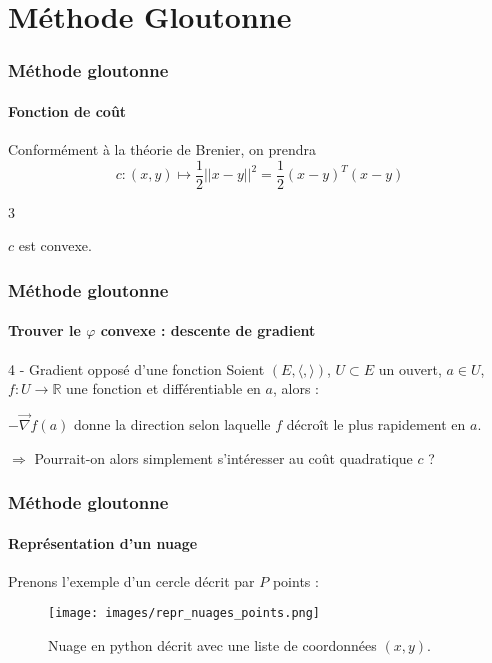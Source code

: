 \documentclass{beamer}
\newcommand{\prop}[2]{\begin{PROP}{#1}{}#2\end{PROP}}
\begin{document}
\section{Méthode Gloutonne}









\begin{frame}
	\frametitle{Méthode gloutonne}
	\framesubtitle{Fonction de coût}
	Conformément à la théorie de Brenier, on prendra \[c : (x,y) \mapsto \frac{1}{2} || x-y ||^2 = \frac{1}{2} (x-y)^T (x-y)\]

	\prop{3}{
		\begin{center}
			$c$ est convexe.
		\end{center}
	}
\end{frame}


\begin{comment}
\begin{frame}
	\frametitle{Méthode gloutonne}
	\framesubtitle{Trouver le $\varphi$ convexe}
	Dans la théorie de Brenier, on utilise un potentiel de Kantorovich $\psi$ : \[\forall x,y \in E, \varphi(x) + \psi(y) \leq c(x,y)\]
	c-conjugaison : \[\varphi(x) := \psi^c(x) = \inf_{y \in E} \left\{c(x,y) - \psi(y)\right\}\]
	\begin{flushright}
		et donc $T(x) = \vec{\nabla} \varphi(x)$
	\end{flushright}
	$\Rightarrow $ Pas vraiment calculable rapidement en python 
\end{frame}
\end{comment}

\begin{frame}
	\frametitle{Méthode gloutonne}
	\framesubtitle{Trouver le $\varphi$ convexe : descente de gradient}
	\prop{4 - Gradient opposé d'une fonction}{
		Soient $(E,\langle , \rangle)$, $U \subset E$ un ouvert, $a \in U$, $f : U \to \mathbb{R}$ une fonction et différentiable en $a$, alors : \begin{center}
			$- \vec{\nabla} f (a)$ donne la direction selon laquelle $f$ décroît le plus rapidement en $a$.
		\end{center}
	}
	$\Rightarrow$ Pourrait-on alors simplement s'intéresser au coût quadratique $c$ ? 
\end{frame}

\begin{frame}
	\frametitle{Méthode gloutonne}
	\framesubtitle{Représentation d'un nuage}
	Prenons l'exemple d'un cercle décrit par $P$ points : 
	 \begin{figure}[h!]
		\centering 
		\texttt{[image: images/repr\_nuages\_points.png]}
		\caption{\label{fig:nuage_python}Nuage en python décrit avec une liste de coordonnées $(x,y)$.}
	\end{figure}

\end{frame}
\end{document}
